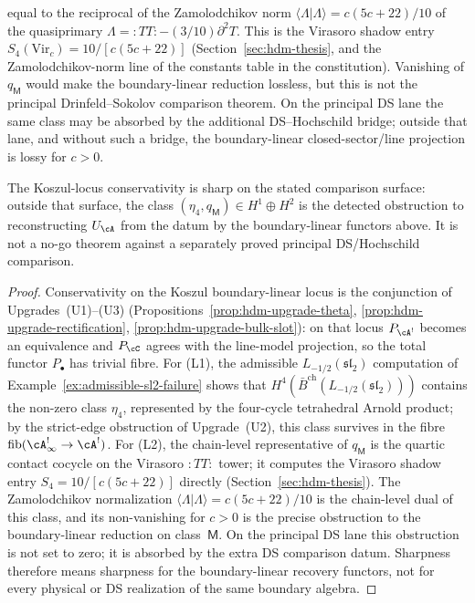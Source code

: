 \begin{theorem}
\begin{enumerate}[label=\textup{(L\arabic*)}]
\[\]
equal to the reciprocal of the Zamolodchikov norm
$\langle\Lambda|\Lambda\rangle=c(5c+22)/10$ of the quasiprimary
$\Lambda={:}TT{:}-(3/10)\partial^2 T$. This is the Virasoro
shadow entry $S_4(\mathrm{Vir}_c)=10/[c(5c+22)]$
(Section~\ref{sec:hdm-thesis}, and the Zamolodchikov-norm line of
the constants table in the constitution). Vanishing of
$q_\mathsf{M}$ would make the boundary-linear reduction lossless, but
this is not the principal Drinfeld--Sokolov comparison theorem. On the
principal DS lane the same class may be absorbed by the additional
DS--Hochschild bridge; outside that lane, and without such a bridge,
the boundary-linear closed-sector/line projection is lossy for $c>0$.
\end{enumerate}
The Koszul-locus conservativity is sharp on the stated comparison
surface: outside that surface, the class
$(\eta_4,q_\mathsf{M})\in H^1\oplus H^2$ is the detected obstruction
to reconstructing $U_\cA$ from the datum by the boundary-linear
functors above. It is not a no-go theorem against a separately proved
principal DS/Hochschild comparison.
\end{theorem}

\begin{proof}
Conservativity on the Koszul boundary-linear locus is the conjunction
of Upgrades~(U1)--(U3)
(Propositions~\ref{prop:hdm-upgrade-theta},
\ref{prop:hdm-upgrade-rectification},
\ref{prop:hdm-upgrade-bulk-slot}):
on that locus $P_{\cA^!}$ becomes an equivalence and $P_\cC$ agrees
with the line-model projection, so the total functor $P_\bullet$ has
trivial fibre. For (L1), the admissible $L_{-1/2}(\mathfrak{sl}_2)$
computation of Example~\ref{ex:admissible-sl2-failure} shows that
$H^4(\bar B^{\mathrm{ch}}(L_{-1/2}(\mathfrak{sl}_2)))$ contains the
non-zero class $\eta_4$, represented by the four-cycle tetrahedral
Arnold product; by the strict-edge obstruction of
Upgrade~(U2), this class survives in the fibre
$\mathrm{fib}(\cA^!_\infty\to\cA^!)$. For (L2), the chain-level
representative of $q_\mathsf{M}$ is the quartic contact cocycle on
the Virasoro ${:}TT{:}$ tower; it computes the Virasoro shadow entry
$S_4=10/[c(5c+22)]$ directly (Section~\ref{sec:hdm-thesis}). The
Zamolodchikov normalization
$\langle\Lambda|\Lambda\rangle=c(5c+22)/10$ is the chain-level dual
of this class, and its non-vanishing for $c>0$ is the precise
obstruction to the boundary-linear reduction on class~$\mathsf{M}$.
On the principal DS lane this obstruction is not set to zero; it is
absorbed by the extra DS comparison datum. Sharpness therefore means
sharpness for the boundary-linear recovery functors, not for every
physical or DS realization of the same boundary algebra.
\end{proof}

